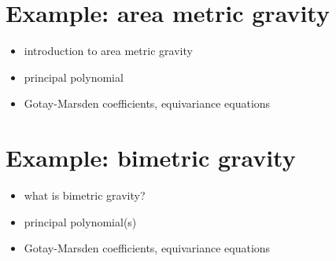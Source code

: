 \section{Example: area metric gravity}
\begin{itemize}
\item introduction to area metric gravity
\item principal polynomial
\item Gotay-Marsden coefficients, equivariance equations
\end{itemize}

\section{Example: bimetric gravity}
\begin{itemize}
\item what is bimetric gravity?
\item principal polynomial(s)
\item Gotay-Marsden coefficients, equivariance equations
\end{itemize}

